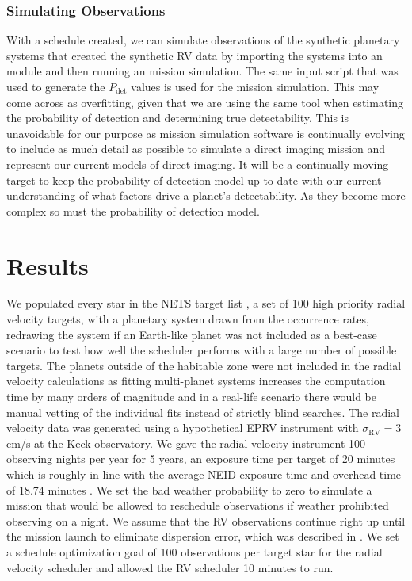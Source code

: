 \subsubsection{Simulating Observations}

With a schedule created, we can simulate observations of the synthetic planetary
systems that created the synthetic RV data by importing the systems into an
  module and then running an
 mission simulation. The same  input script that
was used to generate the $P_\textrm{det}$ values is used for the mission
simulation. This may come across as overfitting, given that we are using the
same tool when estimating the probability of detection and determining true
detectability. This is unavoidable for our purpose as mission simulation
software is continually evolving to include as much detail as possible to
simulate a direct imaging mission and represent our current models of direct
imaging. It will be a continually moving target to keep the probability of
detection model up to date with our current understanding of what factors drive
a planet's detectability. As they become more complex so must the probability
of detection model.

\section{Results}

We populated every star in the NETS target list
\citep{guptaTargetPrioritization2021}, a set of 100 high priority radial
velocity targets, with a planetary system drawn from the
\citet{dulzJointRadialVelocity2020} occurrence rates, redrawing the system if
an Earth-like planet was not included as a best-case scenario to test how well
the scheduler performs with a large number of possible targets. The planets
outside of the habitable zone were not included in the radial velocity
calculations as fitting multi-planet systems increases the computation time by
many orders of magnitude and in a real-life scenario there would be manual
vetting of the individual fits instead of strictly blind searches. The radial
velocity data was generated using a hypothetical EPRV instrument with
$\sigma_\textrm{RV} = 3$ cm/s at the Keck observatory. We gave the radial
velocity instrument 100 observing nights per year for 5 years, an exposure time
per target of 20 minutes which is roughly in line with the average NEID
exposure time and overhead time of 18.74 minutes
\citep{guptaTargetPrioritization2021}. We set the bad weather probability to
zero to simulate a mission that would be allowed to reschedule
observations if weather prohibited observing on a night. We assume that the RV
observations continue right up until the mission launch to eliminate dispersion
error, which was described in . We set a schedule
optimization goal of 100 observations per target star for the radial velocity
scheduler and allowed the RV scheduler 10 minutes to run.

